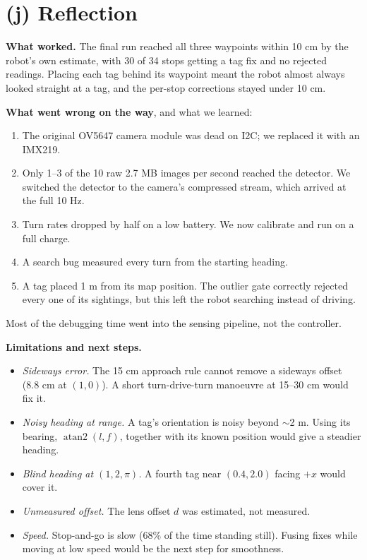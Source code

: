 \documentclass[10pt]{article}
\begin{document}
\section*{(j) Reflection}
\textbf{What worked.} The final run reached all three waypoints within 10 cm by the robot's own estimate, with 30 of 34 stops getting a tag fix and no rejected readings. Placing each tag behind its waypoint meant the robot almost always looked straight at a tag, and the per-stop corrections stayed under 10 cm.

\textbf{What went wrong on the way}, and what we learned:
\begin{enumerate}
  \item The original OV5647 camera module was dead on I2C; we replaced it with an IMX219.
  \item Only 1--3 of the 10 raw 2.7 MB images per second reached the detector. We switched the detector to the camera's compressed stream, which arrived at the full 10 Hz.
  \item Turn rates dropped by half on a low battery. We now calibrate and run on a full charge.
  \item A search bug measured every turn from the starting heading.
  \item A tag placed 1 m from its map position. The outlier gate correctly rejected every one of its sightings, but this left the robot searching instead of driving.
\end{enumerate}
Most of the debugging time went into the sensing pipeline, not the controller.

\textbf{Limitations and next steps.}
\begin{itemize}
  \item \emph{Sideways error.} The 15 cm approach rule cannot remove a sideways offset (8.8 cm at $(1,0)$). A short turn-drive-turn manoeuvre at 15--30 cm would fix it.
  \item \emph{Noisy heading at range.} A tag's orientation is noisy beyond $\sim$2 m. Using its bearing, $\operatorname{atan2}(l, f)$, together with its known position would give a steadier heading.
  \item \emph{Blind heading at $(1,2,\pi)$.} A fourth tag near $(0.4, 2.0)$ facing $+x$ would cover it.
  \item \emph{Unmeasured offset.} The lens offset $d$ was estimated, not measured.
  \item \emph{Speed.} Stop-and-go is slow (68\% of the time standing still). Fusing fixes while moving at low speed would be the next step for smoothness.
\end{itemize}
\end{document}
